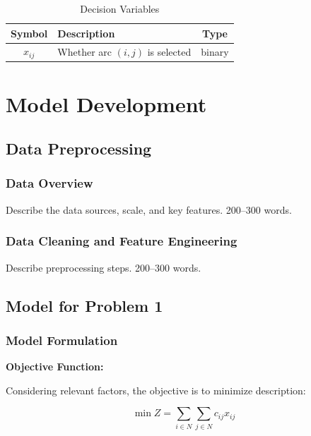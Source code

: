 \documentclass[12pt,letterpaper]{article}
\numberwithin{equation}{section}
\numberwithin{figure}{section}
\numberwithin{table}{section}
\begin{document}
\begin{table}[H]
\centering
\caption{Decision Variables}
\label{tab:variables}
\begin{tabular}{c|l|c}
\toprule
\textbf{Symbol} & \textbf{Description} & \textbf{Type} \\
\midrule
$x_{ij}$ & Whether arc $(i,j)$ is selected & binary \\
\bottomrule
\end{tabular}
\end{table}

\section{Model Development}

\subsection{Data Preprocessing}
\subsubsection{Data Overview}
\textlangle Describe the data sources, scale, and key features. 200--300 words.\textrangle

\subsubsection{Data Cleaning and Feature Engineering}
\textlangle Describe preprocessing steps. 200--300 words.\textrangle

\subsection{Model for Problem 1}

\subsubsection{Model Formulation}

\textbf{Objective Function:}

Considering \textlangle relevant factors\textrangle, the objective is to minimize \textlangle description\textrangle:

\begin{equation}\label{eq:objective}
\min Z = \sum_{i \in N} \sum_{j \in N} c_{ij} x_{ij}
\end{equation}
\end{document}
